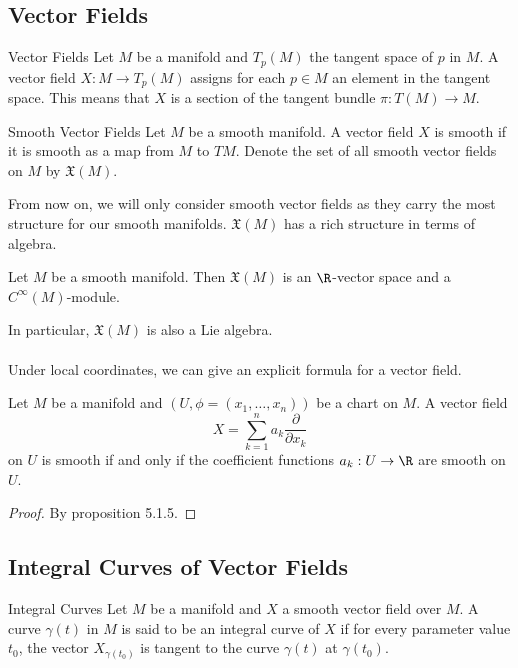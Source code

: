 \documentclass[a4paper]{article}
\begin{document}
\subsection{Vector Fields}
\begin{defn}{Vector Fields}{} Let $M$ be a manifold and $T_p(M)$ the tangent space of $p$ in $M$. A vector field $X:M\to T_p(M)$ assigns for each $p\in M$ an element in the tangent space. This means that $X$ is a section of the tangent bundle $\pi:T(M)\to M$. 
\end{defn}

\begin{defn}{Smooth Vector Fields}{} Let $M$ be a smooth manifold. A vector field $X$ is smooth if it is smooth as a map from $M$ to $TM$. Denote the set of all smooth vector fields on $M$ by $\mathfrak{X}(M)$. 
\end{defn}

From now on, we will only consider smooth vector fields as they carry the most structure for our smooth manifolds. $\mathfrak{X}(M)$ has a rich structure in terms of algebra. 

\begin{prp}{}{} Let $M$ be a smooth manifold. Then $\mathfrak{X}(M)$ is an $\R$-vector space and a $C^\infty(M)$-module. 
\end{prp}

In particular, $\mathfrak{X}(M)$ is also a Lie algebra. \\~\\

Under local coordinates, we can give an explicit formula for a vector field. 

\begin{prp}{}{} Let $M$ be a manifold and $(U,\phi=(x_1,\dots,x_n))$ be a chart on $M$. A vector field $$X=\sum_{k=1}^na_k\frac{\partial}{\partial x_k}$$ on $U$ is smooth if and only if the coefficient functions $a_k:U\to\R$ are smooth on $U$. \tcbline
\begin{proof}
By proposition 5.1.5. 
\end{proof}
\end{prp}

\subsection{Integral Curves of Vector Fields}
\begin{defn}{Integral Curves}{} Let $M$ be a manifold and $X$ a smooth vector field over $M$. A curve $\gamma(t)$ in $M$ is said to be an integral curve of $X$ if for every parameter value $t_0$, the vector $X_{\gamma(t_0)}$ is tangent to the curve $\gamma(t)$ at $\gamma(t_0)$. 
\end{defn}
\end{document}
